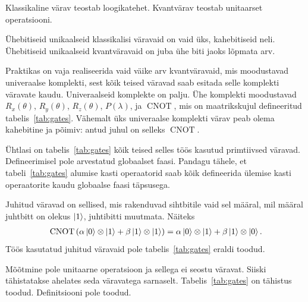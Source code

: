 \documentclass[12pt]{report}
\def\paren#1{\left(#1\right)}
\def\ket#1{\mathinner{|#1\rangle}}
\def\CNOT{\mathop{\mathrm{CNOT}}\nolimits}
\begin{document}
Klassikaline värav teostab loogikatehet. Kvantvärav teostab unitaarset
operatsiooni.

Ühebitiseid unikaalseid klassikalisi väravaid on vaid üks, kahebitiseid neli.
Ühebitiseid unikaalseid kvantväravaid on juba ühe biti jaoks lõpmata arv.

Praktikas on vaja realiseerida vaid väike arv kvantväravaid, mis moodustavad
univeraalse komplekti, sest kõik teised väravad saab esitada selle komplekti
väravate kaudu. Univeraalseid komplekte on palju. Ühe komplekti moodustavad
\(R_x(\theta)\), \(R_y(\theta)\), \(R_z(\theta)\), \(P(\lambda)\), ja
\(\CNOT\), mis on maatrikskujul defineeritud tabelis~\ref{tab:gates}. Vähemalt
üks univeraalse komplekti värav peab olema kahebitine ja põimiv: antud juhul on
selleks \(\CNOT\).

Ühtlasi on tabelis~\ref{tab:gates} kõik teised selles töös kasutud primtiivsed
väravad. Defineerimisel pole arvestatud globaalset faasi. Pandagu tähele, et
tabeli~\ref{tab:gates} alumise kasti operaatorid saab kõik defineerida ülemise
kasti operaatorite kaudu globaalse faasi täpsusega.

Juhitud väravad on sellised, mis rakenduvad sihtbitile vaid sel määral, mil
määral juhtbitt on olekus \(\ket1\), juhtibitti muutmata. Näiteks
\begin{align}
    \CNOT \paren{\alpha \ket{0} \otimes \ket{1} + \beta \ket{1} \otimes \ket{1}}
    = \alpha \ket{0} \otimes \ket{1} + \beta \ket{1} \otimes \ket{0} \rlap{.}
\end{align}
Töös kasutatud juhitud väravaid pole tabelis~\ref{tab:gates} eraldi toodud.

Mõõtmine pole unitaarne operatsioon ja sellega ei seostu väravat. Siiski
tähistatakse ahelates seda väravatega sarnaselt. Tabelis~\ref{tab:gates} on
tähistus toodud. Definitsiooni pole toodud.
\end{document}
